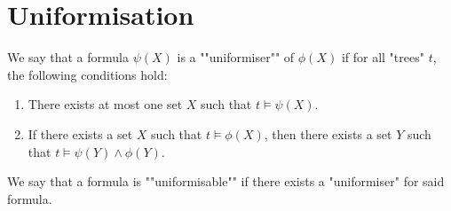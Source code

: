 \documentclass[a4paper,UKenglish,cleveref, autoref, thm-restate]{lipics-v2021}
\begin{document}
\section{Uniformisation}\label{sec:uniformisation}

\begin{definition}[Uniformiser]\label{def:uniformiser}
	We say that a formula $\psi(X)$ is a ""uniformiser"" of $\phi(X)$ if for all "trees" $t$, the following conditions hold:
	\begin{enumerate}
		\item There exists at most one set $X$ such that $t \models \psi(X)$.
		\item If there exists a set $X$ such that $t \models \phi(X)$, then there exists a set $Y$ such that $t \models \psi(Y) \land \phi(Y)$.
	\end{enumerate}

	We say that a formula is ""uniformisable"" if there exists a "uniformiser" for said formula.
\end{definition}


\iffalse
	\begin{lemma}
		$\psi(X)$ is a "uniformiser" of $\phi(X)$ if and only if for all "trees" $t$, the following holds:
		\begin{eqnarray*}
			t \models &\quad &  \forall X \forall Y \, \Big((\psi(X) \land \psi(Y)) \rightarrow X = Y\Big) \\
			& \land & (\exists X \, \phi(X)) \rightarrow (\exists X \, \psi(X)) \\
			& \land& (\forall X \, \psi(X) \rightarrow \phi(X)).
		\end{eqnarray*}
	\end{lemma}

	\begin{proof}
		We analyze the conditions in the first formulation and show their correspondence to the logical constraints in the second formulation:

		\begin{enumerate}
			\item The formula $\forall X \forall Y \, (\psi(X) \land \psi(Y) \rightarrow X = Y)$ ensures that $\psi$ has at most one solution
			      in $t$. This directly corresponds to the first condition in the original problem statement.

			\item The formula $\exists X \, \phi(X) \rightarrow \exists X \, \psi(X)$ expresses that whenever $\phi$ has a solution, $\psi$ must also have a solution.
			      However, this does not require $\psi$ to hold for the same one as $\phi$.

			      The formula $\forall X \, (\psi(X) \rightarrow \phi(X))$ ensures that whenever $\psi$ holds for a set, $\phi$ must also hold for that same set.

			      Combining the last two constraints, we obtain the second condition: whenever there exists a set satisfying $\phi$, there must exist a set
			      satisfying both $\psi$ and $\phi$.
		\end{enumerate}
	\end{proof}
\fi
\end{document}
